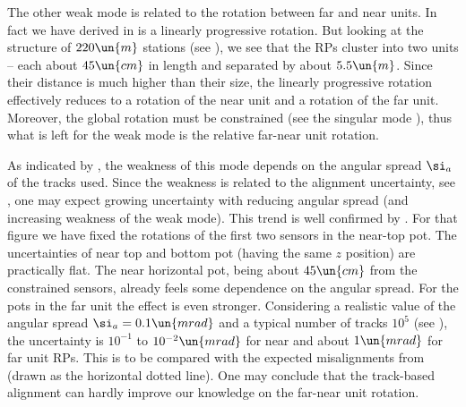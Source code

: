 
The other weak mode is related to the rotation between far and near units. In fact we have derived in  is a linearly progressive rotation. But looking at the structure of $220\un{m}$ stations (see ), we see that the RPs cluster into two units -- each about $45\un{cm}$ in length and separated by about $5.5\un{m}$. Since their distance is much higher than their size, the linearly progressive rotation effectively reduces to a rotation of the near unit and a rotation of the far unit. Moreover, the global rotation must be constrained (see the singular mode ), thus what is left for the weak mode is the relative far-near unit rotation.

As indicated by , the weakness of this mode depends on the angular spread $\si_a$ of the tracks used. Since the weakness is related to the alignment uncertainty, see , one may expect growing uncertainty with reducing angular spread (and increasing weakness of the weak mode). This trend is well confirmed by . For that figure we have fixed the rotations of the first two sensors in the near-top pot. The uncertainties of near top and bottom pot (having the same $z$ position) are practically flat. The near horizontal pot, being about $45\un{cm}$ from the constrained sensors, already feels some dependence on the angular spread. For the pots in the far unit the effect is even stronger. Considering a realistic value of the angular spread $\si_a =  0.1\un{mrad}$ and a typical number of tracks $10^5$ (see ), the uncertainty is $10^{-1}$ to $10^{-2}\un{mrad}$ for near and about $1\un{mrad}$ for far unit RPs. This is to be compared with the expected misalignments from  (drawn as the horizontal dotted line). One may conclude that the track-based alignment can hardly improve our knowledge on the far-near unit rotation.

